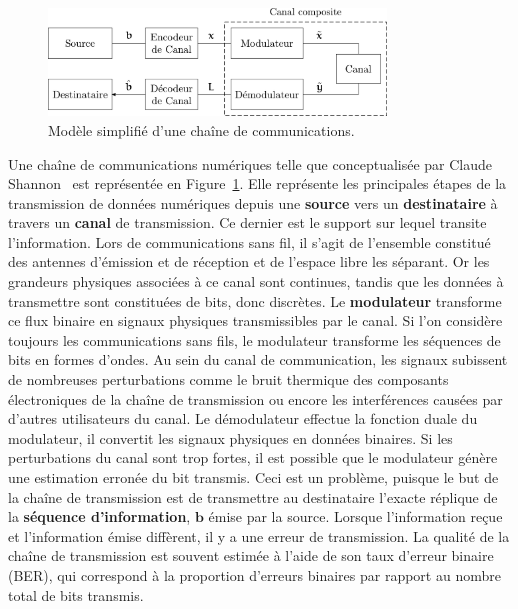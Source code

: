 \begin{figure}[t]
\centering
\includegraphics[width=0.8\textwidth]{main/ch1_fig/chaine_com}
\caption{Modèle simplifié d'une chaîne de communications.}
\label{fig:chaine_com}
\end{figure}
Une chaîne de communications numériques telle que conceptualisée par Claude Shannon~\cite{shannon_mathematical_2001} est représentée en Figure~\ref{fig:chaine_com}.
Elle représente les principales étapes de la transmission de données numériques depuis une \textbf{source} vers un \textbf{destinataire} à travers un \textbf{canal} de transmission.
Ce dernier est le support sur lequel transite l'information. Lors de communications sans fil, il s'agit de l'ensemble constitué des antennes d'émission et de réception et de l'espace libre les séparant. Or les grandeurs physiques associées à ce canal sont continues, tandis que les données à transmettre sont constituées de bits, donc discrètes. Le \textbf{modulateur} transforme ce flux binaire en signaux physiques transmissibles par le canal. Si l'on considère toujours les communications sans fils, le modulateur transforme les séquences de bits en formes d'ondes. Au sein du canal de communication, les signaux subissent de nombreuses perturbations comme le bruit thermique des composants électroniques de la chaîne de transmission ou encore les interférences causées par d'autres utilisateurs du canal. Le démodulateur effectue la fonction duale du modulateur, il convertit les signaux physiques en données binaires. Si les perturbations du canal sont trop fortes, il est possible que le modulateur génère une estimation erronée du bit transmis. Ceci est un problème, puisque le but de la chaîne de transmission est de transmettre au destinataire l'exacte réplique de la \textbf{séquence d'information}, $\mathbold{b}$ émise par la source. Lorsque l'information reçue et l'information émise diffèrent, il y a une erreur de transmission. La qualité de la chaîne de transmission est souvent estimée à l'aide de son taux d'erreur binaire (BER), qui correspond à la proportion d'erreurs binaires par rapport au nombre total de bits transmis.


